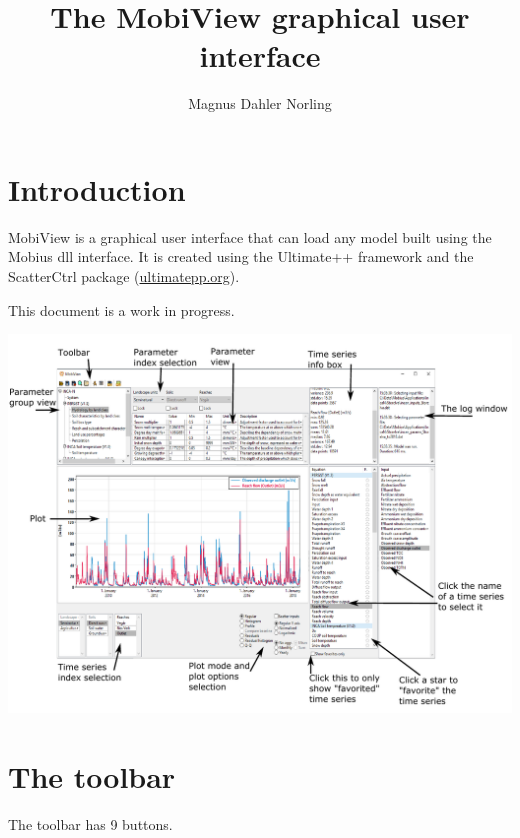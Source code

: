 \documentclass[11pt]{article}
\title{The MobiView graphical user interface}
\author{Magnus Dahler Norling}
\theoremstyle{definition}
\begin{document}
\maketitle

\tableofcontents

\section{Introduction}

MobiView is a graphical user interface that can load any model built using the Mobius dll interface. It is created using the Ultimate++ framework and the ScatterCtrl package (\url{ultimatepp.org}).

This document is a work in progress.

\begin{center}
\includegraphics[width=\linewidth]{img/mobiview}
\end{center}

\section{The toolbar}

The toolbar has 9 buttons.
\end{document}
